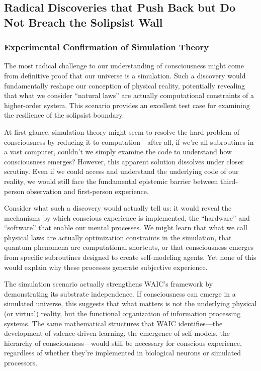 \documentclass[12pt]{article}
\begin{document}
\subsection{Radical Discoveries that Push Back but Do Not Breach the Solipsist Wall}

\subsubsection{Experimental Confirmation of Simulation Theory}

The most radical challenge to our understanding of consciousness might come from definitive proof that our universe is a simulation. Such a discovery would fundamentally reshape our conception of physical reality, potentially revealing that what we consider ``natural laws'' are actually computational constraints of a higher-order system. This scenario provides an excellent test case for examining the resilience of the solipsist boundary.

At first glance, simulation theory might seem to resolve the hard problem of consciousness by reducing it to computation---after all, if we're all subroutines in a vast computer, couldn't we simply examine the code to understand how consciousness emerges? However, this apparent solution dissolves under closer scrutiny. Even if we could access and understand the underlying code of our reality, we would still face the fundamental epistemic barrier between third-person observation and first-person experience.

Consider what such a discovery would actually tell us: it would reveal the mechanisms by which conscious experience is implemented, the ``hardware'' and ``software'' that enable our mental processes. We might learn that what we call physical laws are actually optimization constraints in the simulation, that quantum phenomena are computational shortcuts, or that consciousness emerges from specific subroutines designed to create self-modeling agents. Yet none of this would explain why these processes generate subjective experience.

The simulation scenario actually strengthens WAIC's framework by demonstrating its substrate independence. If consciousness can emerge in a simulated universe, this suggests that what matters is not the underlying physical (or virtual) reality, but the functional organization of information processing systems. The same mathematical structures that WAIC identifies---the development of valence-driven learning, the emergence of self-models, the hierarchy of consciousness---would still be necessary for conscious experience, regardless of whether they're implemented in biological neurons or simulated processors.
\end{document}
